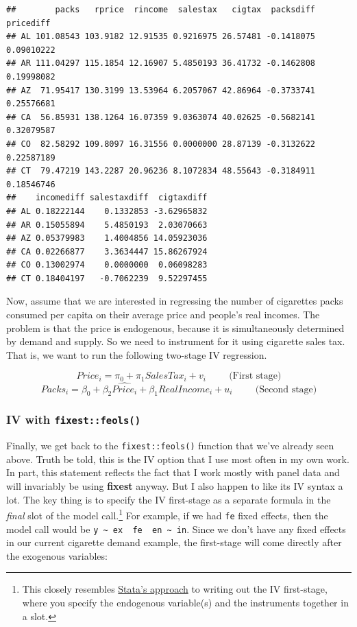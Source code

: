 \documentclass[
]{article}
\begin{document}
\begin{verbatim}
##        packs   rprice  rincome  salestax   cigtax  packsdiff  pricediff
## AL 101.08543 103.9182 12.91535 0.9216975 26.57481 -0.1418075 0.09010222
## AR 111.04297 115.1854 12.16907 5.4850193 36.41732 -0.1462808 0.19998082
## AZ  71.95417 130.3199 13.53964 6.2057067 42.86964 -0.3733741 0.25576681
## CA  56.85931 138.1264 16.07359 9.0363074 40.02625 -0.5682141 0.32079587
## CO  82.58292 109.8097 16.31556 0.0000000 28.87139 -0.3132622 0.22587189
## CT  79.47219 143.2287 20.96236 8.1072834 48.55643 -0.3184911 0.18546746
##    incomediff salestaxdiff  cigtaxdiff
## AL 0.18222144    0.1332853 -3.62965832
## AR 0.15055894    5.4850193  2.03070663
## AZ 0.05379983    1.4004856 14.05923036
## CA 0.02266877    3.3634447 15.86267924
## CO 0.13002974    0.0000000  0.06098283
## CT 0.18404197   -0.7062239  9.52297455
\end{verbatim}

Now, assume that we are interested in regressing the number of
cigarettes packs consumed per capita on their average price and people's
real incomes. The problem is that the price is endogenous, because it is
simultaneously determined by demand and supply. So we need to instrument
for it using cigarette sales tax. That is, we want to run the following
two-stage IV regression.

\[Price_i = \pi_0 + \pi_1 SalesTax_i + v_i  \hspace{1cm} \text{(First stage)}\]
\[Packs_i = \beta_0 + \beta_2\widehat{Price_i} + \beta_1 RealIncome_i + u_i \hspace{1cm} \text{(Second stage)}\]

\hypertarget{iv-with-fixestfeols}{%
\subsubsection{\texorpdfstring{IV with
\texttt{fixest::feols()}}{IV with fixest::feols()}}\label{iv-with-fixestfeols}}

Finally, we get back to the \texttt{fixest::feols()} function that we've
already seen above. Truth be told, this is the IV option that I use most
often in my own work. In part, this statement reflects the fact that I
work mostly with panel data and will invariably be using \textbf{fixest}
anyway. But I also happen to like its IV syntax a lot. The key thing is
to specify the IV first-stage as a separate formula in the \emph{final}
slot of the model call.\footnote{This closely resembles
  \href{https://www.stata.com/manuals13/rivregress.pdf}{Stata's
  approach} to writing out the IV first-stage, where you specify the
  endogenous variable(s) and the instruments together in a slot.} For
example, if we had \texttt{fe} fixed effects, then the model call would
be
\texttt{y\ \textasciitilde{}\ ex\ \textbar{}\ fe\ \textbar{}\ en\ \textasciitilde{}\ in}.
Since we don't have any fixed effects in our current cigarette demand
example, the first-stage will come directly after the exogenous
variables:
\end{document}
